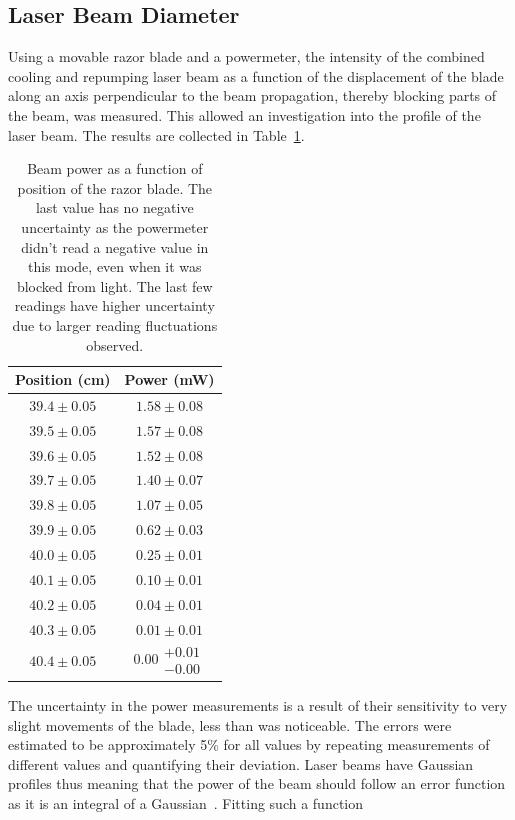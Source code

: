 \documentclass[twocolumn]{article}
\begin{document}
\subsection{Laser Beam Diameter} \label{sec:diam}
Using a movable razor blade and a powermeter, the intensity of the combined cooling and repumping laser beam as a function of the displacement of the blade along an axis perpendicular to the beam propagation, thereby blocking parts of the beam, was measured. This allowed an investigation into the profile of the laser beam. The results are collected in Table~\ref{table:beampower}. 
\begin{table} [!h]
	\centering
	\begin{tabular}{|c|c|}
		\hline
		Position (cm)	& Power (mW)\\
		\hline
		$39.4 \pm 0.05$	&	$1.58 \pm 0.08$\\ 	\hline
		$39.5 \pm 0.05$	&	$1.57 \pm 0.08$\\ 	\hline
		$39.6 \pm 0.05$	&	$1.52 \pm 0.08$\\ 	\hline
		$39.7 \pm 0.05$	&	$1.40 \pm 0.07$\\ 	\hline
		$39.8 \pm 0.05$	&	$1.07 \pm 0.05$\\ 	\hline
		$39.9 \pm 0.05$	&	$0.62 \pm 0.03$\\ 	\hline
		$40.0 \pm 0.05$	&	$0.25 \pm 0.01$\\ 	\hline
		$40.1 \pm 0.05$	&	$0.10 \pm 0.01$\\ 	\hline
		$40.2 \pm 0.05$	&	$0.04 \pm 0.01$\\	\hline
		$40.3 \pm 0.05$	&	$0.01 \pm 0.01$\\	\hline
		$40.4 \pm 0.05$	&	$0.00 \substack{+0.01 \\ -0.00}$\\	\hline
	\end{tabular}
	\caption{Beam power as a function of position of the razor blade. The last value has no negative uncertainty as the powermeter didn't read a negative value in this mode, even when it was blocked from light. The last few readings have higher uncertainty due to larger reading fluctuations observed.}
	\label{table:beampower}
\end{table}
The uncertainty in the power measurements is a result of their sensitivity to very slight movements of the blade, less than was noticeable. The errors were estimated to be approximately 5\% for all values by repeating measurements of different values and quantifying their deviation. Laser beams have Gaussian profiles thus meaning that the power of the beam should follow an error function as it is an integral of a Gaussian~\cite{beam}. Fitting such a function
\end{document}

